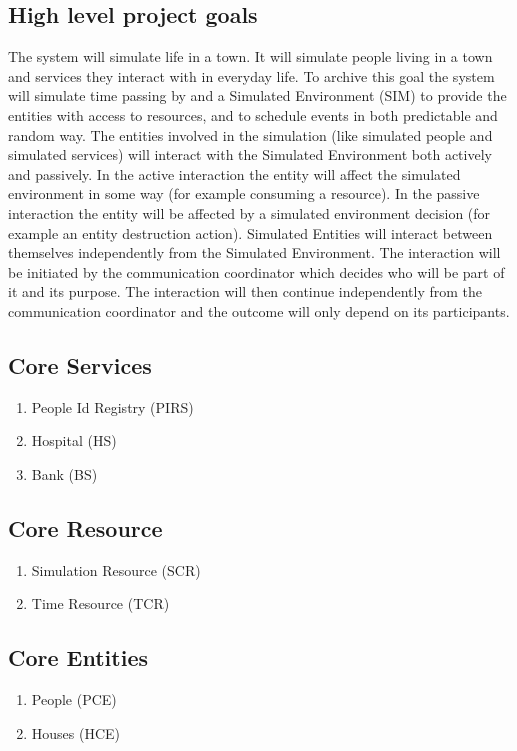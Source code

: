 \subsection{High level project goals} 
The system will simulate life in a town. It will simulate people living in a town and services they interact with in everyday life. 
To archive this goal the system will simulate time passing by and a Simulated Environment (SIM) to provide the entities with access to resources, 
and to schedule events in both predictable and random way.
The entities involved in the simulation (like simulated people and simulated services) will interact with the Simulated Environment both actively and passively. 
In the active interaction the entity will affect the simulated environment in some way (for example consuming a resource). 
In the passive interaction the entity will be affected by a simulated environment decision (for example an entity destruction action).
Simulated Entities will interact between themselves independently from the Simulated Environment. The interaction will be initiated by the communication coordinator
which decides who will be part of it and its purpose. The interaction will then continue independently from the communication coordinator and the outcome will only depend on 
its participants.

\subsection{Core Services} 
\begin{enumerate}
\item People Id Registry (PIRS)
\item Hospital (HS)
\item Bank (BS)
\end{enumerate}

\subsection{Core Resource} 
\begin{enumerate}
\item Simulation Resource (SCR)
\item Time Resource (TCR)
\end{enumerate}

\subsection{Core Entities} 
\begin{enumerate}
\item People (PCE)
\item Houses (HCE)
\end{enumerate}

